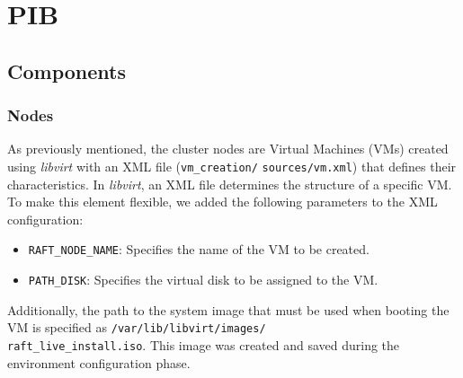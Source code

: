 
\section{PIB}
\subsection{Components}
\subsubsection{Nodes}
As previously mentioned, the cluster nodes are Virtual Machines (VMs) created using \textit{libvirt} with an XML file
(\texttt{vm\_creation/} \texttt{sources/vm.xml}) that defines their characteristics.
In \textit{libvirt}, an XML file determines the structure of a specific VM. To make this element flexible, we added 
the following parameters to the XML configuration:
\begin{itemize}
  \item \texttt{RAFT\_NODE\_NAME}: Specifies the name of the VM to be created.
  \item \texttt{PATH\_DISK}: Specifies the virtual disk to be assigned to the VM.
\end{itemize}
Additionally, the path to the system image that must be used when booting the VM is specified as 
\texttt{/var/lib/}\texttt{libvirt/images/}\\ \texttt{raft\_live\_install.iso}. This image was created and saved during the 
environment configuration phase.

